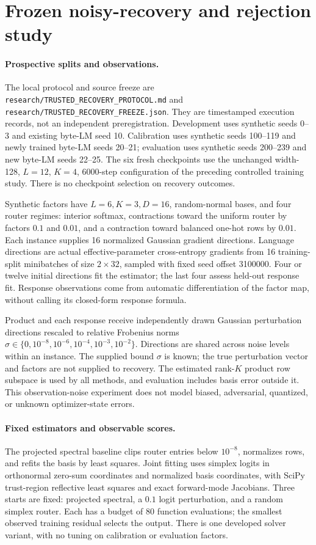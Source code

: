 \section{Frozen noisy-recovery and rejection study}
\label{app:trusted-experiments}

\paragraph{Prospective splits and observations.}
The local protocol and source freeze are
\texttt{research/TRUSTED\_RECOVERY\_PROTOCOL.md} and
\texttt{research/TRUSTED\_RECOVERY\_FREEZE.json}.
They are timestamped execution records, not an independent preregistration.
Development uses synthetic seeds 0--3 and existing byte-LM seed 10.
Calibration uses synthetic seeds 100--119 and newly trained byte-LM seeds
20--21; evaluation uses synthetic seeds 200--239 and new byte-LM seeds
22--25. The six fresh checkpoints use the unchanged width-128, $L=12$,
$K=4$, 6000-step configuration of the preceding controlled training study.
There is no checkpoint selection on recovery outcomes.

Synthetic factors have $L=6,K=3,D=16$, random-normal bases, and four router
regimes: interior softmax, contractions toward the uniform router by factors
$0.1$ and $0.01$, and a contraction toward balanced one-hot rows by $0.01$.
Each instance supplies 16 normalized Gaussian gradient directions.
Language directions are actual effective-parameter cross-entropy gradients
from 16 training-split minibatches of size $2\times32$, sampled with fixed
seed offset 3100000. Four or twelve initial directions fit the estimator;
the last four assess held-out response fit. Response observations come from
automatic differentiation of the factor map, without calling its closed-form
response formula.

Product and each response receive independently drawn Gaussian perturbation
directions rescaled to relative Frobenius norms
$\sigma\in\{0,10^{-8},10^{-6},10^{-4},10^{-3},10^{-2}\}$.
Directions are shared across noise levels within an instance.
The supplied bound $\sigma$ is known; the true perturbation vector and factors
are not supplied to recovery. The estimated rank-$K$ product row subspace
is used by all methods, and evaluation includes basis error outside it.
This observation-noise experiment does not model biased, adversarial,
quantized, or unknown optimizer-state errors.

\paragraph{Fixed estimators and observable scores.}
The projected spectral baseline clips router entries below $10^{-8}$,
normalizes rows, and refits the basis by least squares. Joint fitting uses
simplex logits in orthonormal zero-sum coordinates and normalized basis
coordinates, with SciPy trust-region reflective least squares and exact
forward-mode Jacobians. Three starts are fixed: projected spectral,
a $0.1$ logit perturbation, and a random simplex router. Each has a budget
of 80 function evaluations; the smallest observed training residual selects
the output. There is one developed solver variant, with no tuning on
calibration or evaluation factors.

